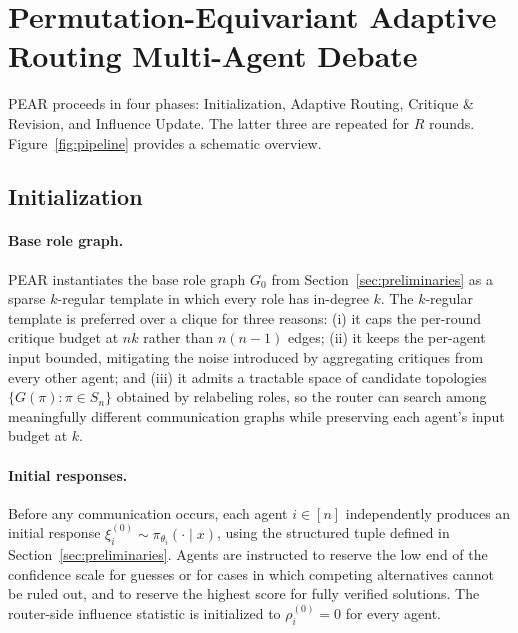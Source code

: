 \section{Permutation-Equivariant Adaptive Routing Multi-Agent Debate}
\label{sec:method}
 
PEAR proceeds in four phases: Initialization, Adaptive Routing, Critique \& Revision, and Influence Update.
The latter three are repeated for $R$ rounds. Figure~\ref{fig:pipeline} provides a schematic overview. %


\subsection{Initialization}
\label{sec:method:initial}
 
\paragraph{Base role graph.}
PEAR instantiates the base role graph $G_0$ from Section~\ref{sec:preliminaries} as a sparse $k$-regular template in which every role has in-degree $k$. The $k$-regular template is preferred over a clique for three reasons: (i) it caps the per-round critique budget at $nk$ rather than $n(n{-}1)$ edges; (ii) it keeps the per-agent input bounded, mitigating the noise introduced by aggregating critiques from every other agent; and (iii) it admits a tractable space of candidate topologies $\{G(\pi):\pi\in S_n\}$ obtained by relabeling roles, so the router can search among meaningfully different communication graphs while preserving each agent's input budget at $k$.

\paragraph{Initial responses.}
Before any communication occurs, each agent $i\in[n]$ independently produces an initial response $\xi_i^{(0)}\sim\pi_{\theta_i}(\cdot\mid x)$, using the structured tuple defined in Section~\ref{sec:preliminaries}. Agents are instructed to reserve the low end of the confidence scale for guesses or for cases in which competing alternatives cannot be ruled out, and to reserve the highest score for fully verified solutions. The router-side influence statistic is initialized to $\rho_i^{(0)}=0$ for every agent.




